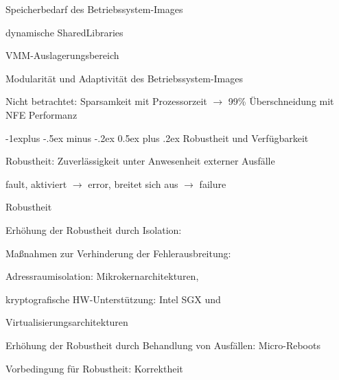 \documentclass[a4paper]{article}
\makeatletter
\renewcommand{\subsection}{\@startsection{subsection}{2}{0mm}%
 {-1explus -.5ex minus -.2ex}%
 {0.5ex plus .2ex}%
 {\normalfont\normalsize\bfseries}}
\makeatother
\begin{document}
\begin{multicols}{3}
\begin{itemize*}
\begin{enumerate*}
            \item Speicherbedarf des Betriebssystem-Images
            \item dynamische SharedLibraries
            \item VMM-Auslagerungsbereich
            \item Modularität und Adaptivität des Betriebssystem-Images
        \end{enumerate*}
        \item Nicht betrachtet: Sparsamkeit mit Prozessorzeit
        $\rightarrow$ 99\% Überschneidung mit NFE Performanz
    \end{itemize*}


    \subsection{Robustheit und
        Verfügbarkeit}

    \begin{itemize*}
        \item Robustheit: Zuverlässigkeit unter Anwesenheit externer Ausfälle
        \item fault, aktiviert $\rightarrow$ error, breitet sich aus
        $\rightarrow$ failure
    \end{itemize*}

    Robustheit

    \begin{itemize*}
        \item Erhöhung der Robustheit durch Isolation:
        \begin{itemize*}
            \item Maßnahmen zur Verhinderung der Fehlerausbreitung:
        \end{itemize*}
        \begin{enumerate*}

            \item Adressraumisolation: Mikrokernarchitekturen,
            \item kryptografische HW-Unterstützung: Intel SGX und
            \item Virtualisierungsarchitekturen
        \end{enumerate*}
        \item Erhöhung der Robustheit durch Behandlung von Ausfällen: Micro-Reboots
    \end{itemize*}

    Vorbedingung für Robustheit: Korrektheit


\end{multicols}
\end{document}
